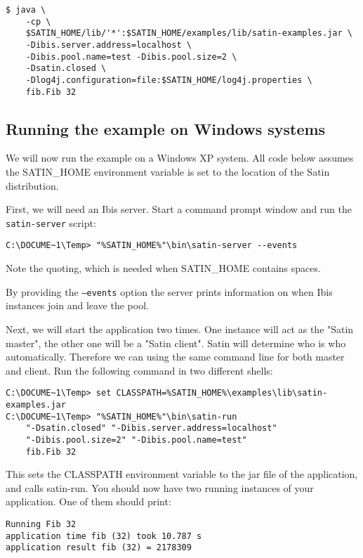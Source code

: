 \documentclass[a4paper,10pt]{article}
\begin{document}
\noindent
{\small
\begin{verbatim}
$ java \
    -cp \
    $SATIN_HOME/lib/'*':$SATIN_HOME/examples/lib/satin-examples.jar \
    -Dibis.server.address=localhost \
    -Dibis.pool.name=test -Dibis.pool.size=2 \
    -Dsatin.closed \
    -Dlog4j.configuration=file:$SATIN_HOME/log4j.properties \
    fib.Fib 32
\end{verbatim}
}
\noindent

\subsection{Running the example on Windows systems}

We will now run the example on a Windows XP system.
All code below assumes the SATIN\_HOME
environment variable is set to the location of the Satin distribution.

First, we will need an Ibis server. Start a command prompt window and
run the \texttt{satin-server} script:
\noindent
{\small
\begin{verbatim}
C:\DOCUME~1\Temp> "%SATIN_HOME%"\bin\satin-server --events
\end{verbatim}
}
\noindent

Note the quoting, which is needed when SATIN\_HOME contains spaces.

By providing the \texttt{--events} option the server
prints information on when Ibis instances join and leave the pool.

Next, we will start the application two times. One instance will act as the
"Satin master", the other one will be a "Satin client".
Satin will determine who is who automatically. Therefore we can using the same
command line for both master and client.
Run the following command in two different shells:

\noindent
{\small
\begin{verbatim}
C:\DOCUME~1\Temp> set CLASSPATH=%SATIN_HOME%\examples\lib\satin-examples.jar
C:\DOCUME~1\Temp> "%SATIN_HOME%"\bin\satin-run
    "-Dsatin.closed" "-Dibis.server.address=localhost"
    "-Dibis.pool.size=2" "-Dibis.pool.name=test"
    fib.Fib 32
\end{verbatim}
}
\noindent

This sets the CLASSPATH environment variable to the jar file of the
application, and calls satin-run. You should now have two running
instances of your application. One of them should print:

\noindent
{\small
\begin{verbatim}
Running Fib 32
application time fib (32) took 10.787 s
application result fib (32) = 2178309
\end{verbatim}
}
\noindent
\end{document}
